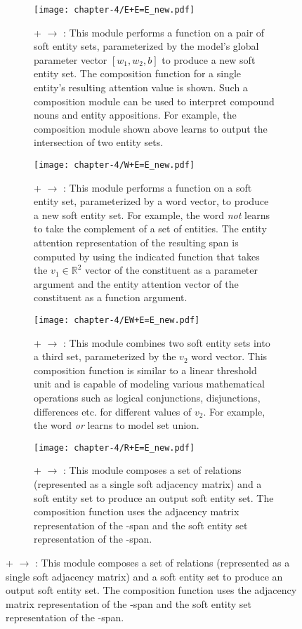 \begin{figure}[t]
  \captionsetup[subfigure]{labelformat=empty}
  \begin{subfigure}[t]{.48\textwidth}
    \centering
    \texttt{[image: chapter-4/E+E=E\_new.pdf]}
    \caption{\label{fig:eee} \scriptsize{ +  $\rightarrow$ : This module performs a function on a pair of soft entity sets, parameterized by the model's global parameter vector $[w_{1}, w_{2}, b]$ to produce a new soft entity set. The composition function for a single entity's resulting attention value is shown. Such a composition module can be used to interpret compound nouns and entity appositions. For example, the composition module shown above learns to output the intersection of two entity sets.}}
  \end{subfigure}
  \hfill
  \begin{subfigure}[t]{.48\textwidth}
    \centering
    \texttt{[image: chapter-4/W+E=E\_new.pdf]}
    \caption{\label{fig:wee}\scriptsize{ +  $\rightarrow$ : This module performs a function on a soft entity set, parameterized by a word vector, to produce a new soft entity set. For example, the word \emph{not} learns to take the complement of a set of entities. The entity attention representation of the resulting span is computed by using the indicated function that takes the $v_{1} \in \mathbb{R}^{2}$ vector of the  constituent as a          parameter argument and the entity attention vector of the  constituent as a function argument.}}
  \end{subfigure}

    \smallskip

  \begin{subfigure}[t]{.48\textwidth}
    \centering
    \texttt{[image: chapter-4/EW+E=E\_new.pdf]}
    \caption{\label{fig:ewee} \scriptsize{ +  $\rightarrow$ : This module combines two soft entity sets into a third set, parameterized by the $v_{2}$ word vector. This composition function is similar to a linear threshold unit and is capable of modeling various mathematical operations such as logical conjunctions, disjunctions, differences etc. for different values of $v_{2}$. For example, the word \emph{or} learns to model set union.}}
  \end{subfigure}
  \hfill
  \begin{subfigure}[t]{.48\textwidth}
    \centering
    \texttt{[image: chapter-4/R+E=E\_new.pdf]}
    \caption{\label{fig:ree}\scriptsize{ +  $\rightarrow$ : This module composes a set of relations (represented as a single soft adjacency matrix) and a soft entity set to produce an output soft entity set. The composition function uses the adjacency matrix representation of the -span and the soft entity set representation of the -span. }}
  \end{subfigure}


\end{figure}
